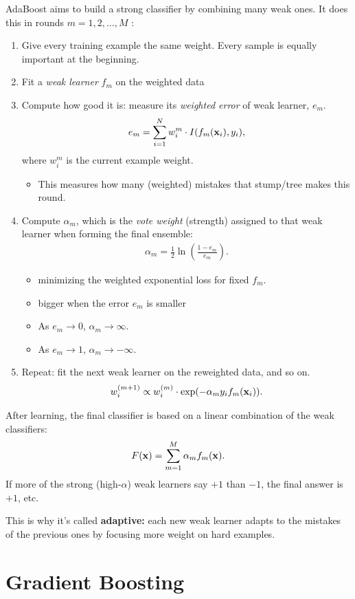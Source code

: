 AdaBoost aims to build a strong classifier by combining many weak ones. It does this in rounds $m=1,2,\dots,M$ :

\begin{enumerate}
	\item Give every training example the same weight. Every sample is equally important at the beginning.
	\item Fit a \textit{weak learner} $f_m$ on the weighted data
	\item Compute how good it is: measure its \textit{weighted error} of weak learner, $e_m$. 
		\begin{align*}
			e_m = \sum_{i=1}^{N}w_i^m \cdot I(f_m({\mathbf{x}}_i), y_i),
		\end{align*}
		where $w_i^m$ is the current example weight. 
		\begin{itemize}
			\item This measures how many (weighted) mistakes that stump/tree makes this round.
		\end{itemize}
	\item Compute $\alpha_m$, which is the \textit{vote weight} (strength) assigned to that weak learner when forming the final ensemble: 
		\begin{align*}
			\alpha_m = \frac{1}{2}\ln \left(\frac{1-e_m}{e_m}\right).
		\end{align*}
		\begin{itemize}
			\item minimizing the weighted exponential loss for fixed $f_m$.
			\item bigger when the error $e_m$ is smaller
			\item As $e_m\to 0$, $\alpha_m\to \infty$.
			\item As $e_m\to 1$, $\alpha_m\to -\infty$.
		\end{itemize}
	\item Repeat: fit the next weak learner on the reweighted data, and so on.
		\begin{align*}
			w_i^{(m+1)}\propto w_i^{(m)}\cdot \exp(-\alpha_m y_i f_m({\mathbf{x}}_i)).
		\end{align*}
\end{enumerate}

After learning, the final classifier is based on a linear combination of the weak classifiers:
\begin{align*}
	F({\mathbf{x}}) = \sum_{m=1}^M \alpha_mf_m({\mathbf{x}}).
\end{align*}
If more of the strong (high-$\alpha$) weak learners say $+1$ than $-1$, the final answer is $+1$, etc.

This is why it's called \textbf{adaptive:} each new weak learner adapts to the mistakes of the previous ones by focusing more weight on hard examples.

\section{Gradient Boosting}




